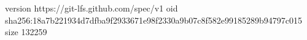 version https://git-lfs.github.com/spec/v1
oid sha256:18a7b221934d7dfba9f2933671e98f2330a9b07c8f582e99185289b94797c015
size 132259
